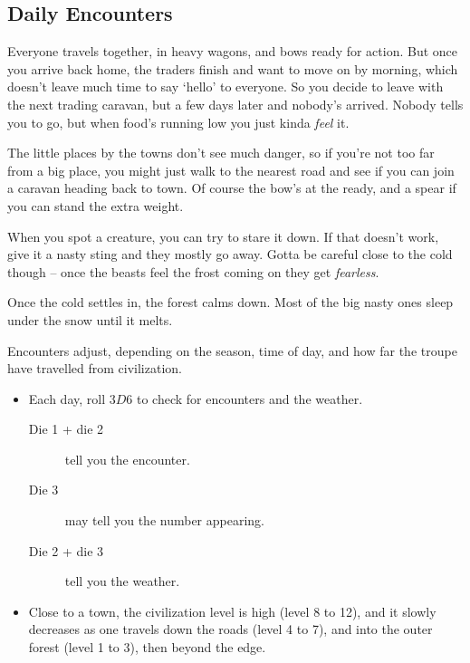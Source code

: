 \begin{multicols}{2}

\subsection{Daily Encounters}

\begin{speechtext}
  Everyone travels together, in heavy wagons, and bows ready for action.
  But once you arrive back home, the traders finish and want to move on by morning, which doesn't leave much time to say `hello' to everyone.
  So you decide to leave with the next trading caravan, but a few days later and nobody's arrived.
  Nobody tells you to go, but when food's running low you just kinda \emph{feel} it.

  The little places by the towns don't see much danger, so if you're not too far from a big place, you might just walk to the nearest road and see if you can join a caravan heading back to town.
  Of course the bow's at the ready, and a spear if you can stand the extra weight.

  When you spot a creature, you can try to stare it down.
  If that doesn't work, give it a nasty sting and they mostly go away.
  Gotta be careful close to the cold though -- once the beasts feel the frost coming on they get \emph{fearless}.

  Once the cold settles in, the forest calms down.
  Most of the big nasty ones sleep under the snow until it melts.
\end{speechtext}


\noindent
Encounters adjust, depending on the season, time of day, and how far the troupe have travelled from civilization.

\begin{itemize}
  \item
  Each day, roll $3D6$ to check for encounters and the weather.
  \begin{description}
    \item[Die 1 + die 2]
    tell you the encounter.
    \item[Die 3]
    may tell you the number appearing.
    \item[Die 2 + die 3]
    tell you the weather.
  \end{description}
  \item
  Close to a town, the civilization level is high (level 8 to 12), and it slowly decreases as one travels down the roads (level 4 to 7), and into the outer forest (level 1 to 3), then beyond the \gls{edge}.


\end{itemize}
\end{multicols}
